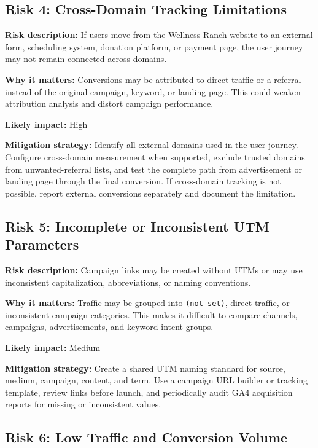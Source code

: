 \documentclass[
  letterpaper,
  DIV=11,
  numbers=noendperiod]{scrartcl}
\begin{document}
\subsection{Risk 4: Cross-Domain Tracking
Limitations}\label{risk-4-cross-domain-tracking-limitations}

\textbf{Risk description:} If users move from the Wellness Ranch website
to an external form, scheduling system, donation platform, or payment
page, the user journey may not remain connected across domains.

\textbf{Why it matters:} Conversions may be attributed to direct traffic
or a referral instead of the original campaign, keyword, or landing
page. This could weaken attribution analysis and distort campaign
performance.

\textbf{Likely impact:} High

\textbf{Mitigation strategy:} Identify all external domains used in the
user journey. Configure cross-domain measurement when supported, exclude
trusted domains from unwanted-referral lists, and test the complete path
from advertisement or landing page through the final conversion. If
cross-domain tracking is not possible, report external conversions
separately and document the limitation.

\subsection{Risk 5: Incomplete or Inconsistent UTM
Parameters}\label{risk-5-incomplete-or-inconsistent-utm-parameters}

\textbf{Risk description:} Campaign links may be created without UTMs or
may use inconsistent capitalization, abbreviations, or naming
conventions.

\textbf{Why it matters:} Traffic may be grouped into
\texttt{(not\ set)}, direct traffic, or inconsistent campaign
categories. This makes it difficult to compare channels, campaigns,
advertisements, and keyword-intent groups.

\textbf{Likely impact:} Medium

\textbf{Mitigation strategy:} Create a shared UTM naming standard for
source, medium, campaign, content, and term. Use a campaign URL builder
or tracking template, review links before launch, and periodically audit
GA4 acquisition reports for missing or inconsistent values.

\subsection{Risk 6: Low Traffic and Conversion
Volume}\label{risk-6-low-traffic-and-conversion-volume}
\end{document}
